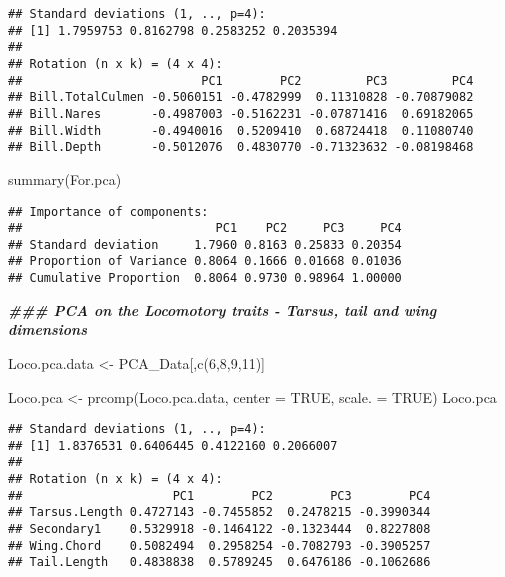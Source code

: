 \documentclass[
]{article}
\newenvironment{Shaded}{\begin{snugshade}}{\end{snugshade}}
\newcommand{\AttributeTok}[1]{\textcolor[rgb]{0.77,0.63,0.00}{#1}}
\newcommand{\ConstantTok}[1]{\textcolor[rgb]{0.00,0.00,0.00}{#1}}
\newcommand{\DecValTok}[1]{\textcolor[rgb]{0.00,0.00,0.81}{#1}}
\newcommand{\DocumentationTok}[1]{\textcolor[rgb]{0.56,0.35,0.01}{\textbf{\textit{#1}}}}
\newcommand{\FunctionTok}[1]{\textcolor[rgb]{0.00,0.00,0.00}{#1}}
\newcommand{\NormalTok}[1]{#1}
\newcommand{\OtherTok}[1]{\textcolor[rgb]{0.56,0.35,0.01}{#1}}
\begin{document}
\begin{verbatim}
## Standard deviations (1, .., p=4):
## [1] 1.7959753 0.8162798 0.2583252 0.2035394
## 
## Rotation (n x k) = (4 x 4):
##                         PC1        PC2         PC3         PC4
## Bill.TotalCulmen -0.5060151 -0.4782999  0.11310828 -0.70879082
## Bill.Nares       -0.4987003 -0.5162231 -0.07871416  0.69182065
## Bill.Width       -0.4940016  0.5209410  0.68724418  0.11080740
## Bill.Depth       -0.5012076  0.4830770 -0.71323632 -0.08198468
\end{verbatim}

\begin{Shaded}
\begin{Highlighting}[]
\FunctionTok{summary}\NormalTok{(For.pca)}
\end{Highlighting}
\end{Shaded}

\begin{verbatim}
## Importance of components:
##                           PC1    PC2     PC3     PC4
## Standard deviation     1.7960 0.8163 0.25833 0.20354
## Proportion of Variance 0.8064 0.1666 0.01668 0.01036
## Cumulative Proportion  0.8064 0.9730 0.98964 1.00000
\end{verbatim}

\begin{Shaded}
\begin{Highlighting}[]
\DocumentationTok{\#\#\# PCA on the Locomotory traits {-} Tarsus, tail and wing dimensions}

\NormalTok{Loco.pca.data }\OtherTok{\textless{}{-}}\NormalTok{ PCA\_Data[,}\FunctionTok{c}\NormalTok{(}\DecValTok{6}\NormalTok{,}\DecValTok{8}\NormalTok{,}\DecValTok{9}\NormalTok{,}\DecValTok{11}\NormalTok{)]}

\NormalTok{Loco.pca }\OtherTok{\textless{}{-}} \FunctionTok{prcomp}\NormalTok{(Loco.pca.data, }\AttributeTok{center =} \ConstantTok{TRUE}\NormalTok{, }\AttributeTok{scale. =} \ConstantTok{TRUE}\NormalTok{)}
\NormalTok{Loco.pca}
\end{Highlighting}
\end{Shaded}

\begin{verbatim}
## Standard deviations (1, .., p=4):
## [1] 1.8376531 0.6406445 0.4122160 0.2066007
## 
## Rotation (n x k) = (4 x 4):
##                     PC1        PC2        PC3        PC4
## Tarsus.Length 0.4727143 -0.7455852  0.2478215 -0.3990344
## Secondary1    0.5329918 -0.1464122 -0.1323444  0.8227808
## Wing.Chord    0.5082494  0.2958254 -0.7082793 -0.3905257
## Tail.Length   0.4838838  0.5789245  0.6476186 -0.1062686
\end{verbatim}
\end{document}
